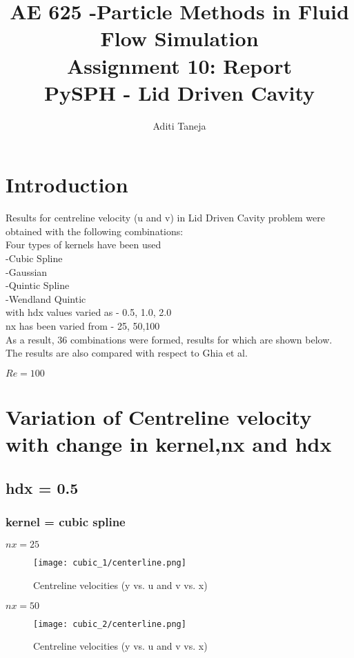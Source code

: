 \documentclass{article}
\title{AE 625 -Particle Methods in Fluid Flow Simulation \\ Assignment 10: Report \\ PySPH - Lid Driven Cavity}
\author{Aditi Taneja}
\date{}
\begin{document}
\maketitle

\tableofcontents
\newpage
\section{Introduction} 
Results for centreline velocity (u and v) in Lid Driven Cavity problem were obtained with the following combinations:
\\
Four types of kernels have been used
\\
-Cubic Spline
\\
-Gaussian
\\
-Quintic Spline
\\
-Wendland Quintic
\\
with hdx values varied as - 0.5, 1.0, 2.0
\\nx has been varied from - 25, 50,100
\\As a result, 36 combinations were formed, results for which are shown below.
\\The results are also compared with respect to Ghia et al. 

$Re = 100 $ 
\\
\newpage
\section{Variation of Centreline velocity with change in kernel,nx and hdx}

\subsection{hdx = 0.5}
\subsubsection{kernel = cubic spline}

$nx = 25 $
\\
\begin{figure}[H]   \label{figure}
\texttt{[image: cubic\_1/centerline.png]}
\caption{Centreline velocities (y vs. u and v vs. x)}
\label{figure:}
\end{figure}

\newpage
$nx = 50 $
\\
\begin{figure}[H]   \label{figure}
\texttt{[image: cubic\_2/centerline.png]}
\caption{Centreline velocities (y vs. u and v vs. x)}
\label{figure:}
\end{figure}
\end{document}
